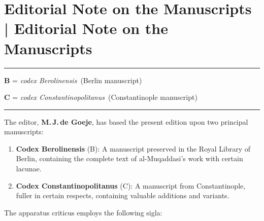 \documentclass[11pt,a4paper]{article}
\newcommand{\codB}{\textit{codex Berolinensis}}
\newcommand{\codC}{\textit{codex Constantinopolitanus}}
\begin{document}
\clearpage


\section*{Editorial Note on the Manuscripts | Editorial Note on the Manuscripts}

\begin{center}
\rule{0.5\textwidth}{0.6pt}
\end{center}

\vspace{0.3cm}

\textbf{B} = \codB\ (Berlin manuscript)

\textbf{C} = \codC\ (Constantinople manuscript)

\vspace{0.3cm}

\begin{center}
\rule{0.5\textwidth}{0.6pt}
\end{center}

\vspace{0.3cm}

The editor, \textbf{M.\,J.\,de Goeje}, has based the present edition upon two principal manuscripts:

\begin{enumerate}[label=\alph*),leftmargin=2em]
\item \textbf{Codex Berolinensis} (B): A manuscript preserved in the Royal Library of Berlin, containing the complete text of al-Muqaddasi's work with certain lacunae.
\item \textbf{Codex Constantinopolitanus} (C): A manuscript from Constantinople, fuller in certain respects, containing valuable additions and variants.
\end{enumerate}

\vspace{0.3cm}

The apparatus criticus employs the following sigla:
\end{document}
